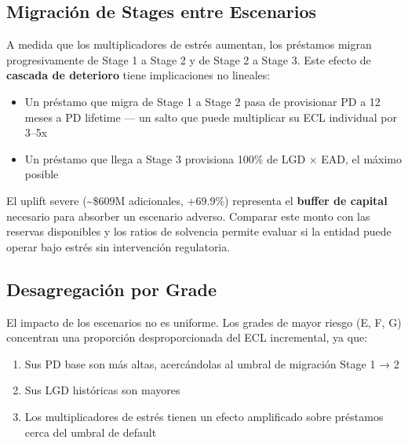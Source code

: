 \documentclass[
  spanish,
  11pt,
  letterpaper,
]{scrbook}
\providecommand{\tightlist}{%
  \setlength{\itemsep}{0pt}\setlength{\parskip}{0pt}}
\theoremstyle{plain}
\theoremstyle{remark}
\begin{document}
\subsection{Migración de Stages entre
Escenarios}\label{migraciuxf3n-de-stages-entre-escenarios}

A medida que los multiplicadores de estrés aumentan, los préstamos
migran progresivamente de Stage 1 a Stage 2 y de Stage 2 a Stage 3. Este
efecto de \textbf{cascada de deterioro} tiene implicaciones no lineales:

\begin{itemize}
\tightlist
\item
  Un préstamo que migra de Stage 1 a Stage 2 pasa de provisionar PD a 12
  meses a PD lifetime --- un salto que puede multiplicar su ECL
  individual por 3--5x
\item
  Un préstamo que llega a Stage 3 provisiona 100\% de LGD \(\times\)
  EAD, el máximo posible
\end{itemize}

\begin{tcolorbox}[enhanced jigsaw, arc=.35mm, bottomrule=.15mm, bottomtitle=1mm, breakable, colback=white, colbacktitle=quarto-callout-tip-color!10!white, colframe=quarto-callout-tip-color-frame, coltitle=black, left=2mm, leftrule=.75mm, opacityback=0, opacitybacktitle=0.6, rightrule=.15mm, title=\textcolor{quarto-callout-tip-color}{\faLightbulb}\hspace{0.5em}{Lectura para Gestión}, titlerule=0mm, toprule=.15mm, toptitle=1mm]

El uplift severe (\textasciitilde\$609M adicionales, +69.9\%) representa
el \textbf{buffer de capital} necesario para absorber un escenario
adverso. Comparar este monto con las reservas disponibles y los ratios
de solvencia permite evaluar si la entidad puede operar bajo estrés sin
intervención regulatoria.

\end{tcolorbox}

\subsection{Desagregación por Grade}\label{desagregaciuxf3n-por-grade}

El impacto de los escenarios no es uniforme. Los grades de mayor riesgo
(E, F, G) concentran una proporción desproporcionada del ECL
incremental, ya que:

\begin{enumerate}
\def\labelenumi{\arabic{enumi}.}
\tightlist
\item
  Sus PD base son más altas, acercándolas al umbral de migración Stage 1
  → 2
\item
  Sus LGD históricas son mayores
\item
  Los multiplicadores de estrés tienen un efecto amplificado sobre
  préstamos cerca del umbral de default
\end{enumerate}
\end{document}
